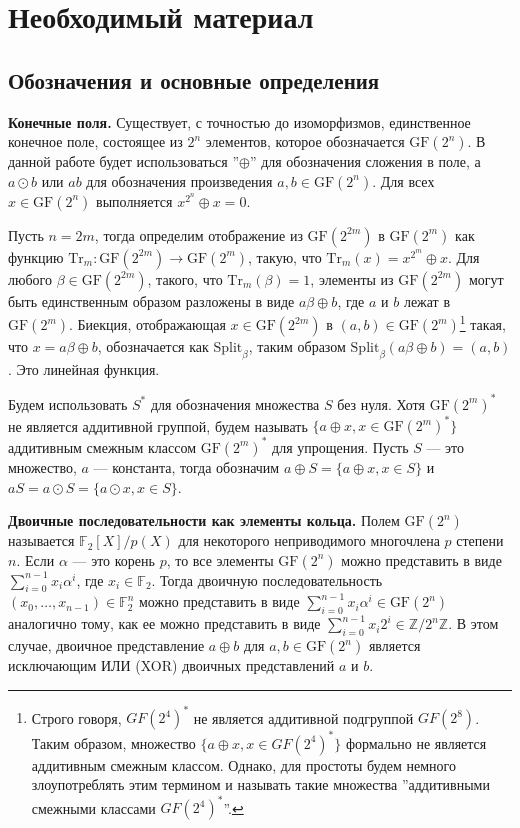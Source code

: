 \section{Необходимый материал}
\subsection{Обозначения и основные определения}
\textbf{Конечные поля.} Существует, с точностью до изоморфизмов, единственное конечное поле, состоящее из \(2^n\) элементов, которое обозначается \(\text{GF}(2^n)\). В данной работе будет использоваться ''\(\oplus\)'' для обозначения сложения в поле, а \(a \odot b\) или \(ab\) для обозначения произведения \(a, b \in \text{GF}(2^n)\). Для всех \(x \in \text{GF}(2^n)\) выполняется \(x^{2^n} \oplus x = 0\).

Пусть \(n = 2m\), тогда определим отображение из \(\text{GF}(2^{2m})\) в \(\text{GF}(2^m)\) как функцию \(\text{Tr}_m: \text{GF}(2^{2m}) \rightarrow \text{GF}(2^m)\), такую, что \(\text{Tr}_m(x) = x^{2^m} \oplus x\). Для любого \(\beta \in \text{GF}(2^{2m})\), такого, что \(\text{Tr}_m(\beta) = 1\), элементы из \(\text{GF}(2^{2m})\) могут быть единственным образом разложены в виде \(a\beta \oplus b\), где \(a\) и \(b\) лежат в \(\text{GF}(2^m)\). Биекция, отображающая \(x \in \text{GF}(2^{2m})\) в \((a, b) \in \text{GF}(2^m)\)\footnote{Строго говоря, \(GF(2^4)^*\) не является аддитивной подгруппой \(GF(2^8)\). Таким образом, множество \(\{a \oplus x, x \in GF(2^4)^*\}\) формально не является аддитивным смежным классом. Однако, для простоты будем немного злоупотреблять этим термином и называть такие множества ''аддитивными смежными классами \(GF(2^4)^*\)''.} такая, что \(x = a\beta \oplus b\), обозначается как \(\text{Split}_\beta\), таким образом \(\text{Split}_\beta(a\beta \oplus b) = (a, b)\). Это линейная функция.

Будем использовать \(S^*\) для обозначения множества \(S\) без нуля. Хотя \(\text{GF}(2^m)^*\) не является аддитивной группой, будем называть \(\{a \oplus x, x \in \text{GF}(2^m)^*\}\) аддитивным смежным классом \(\text{GF}(2^m)^*\) для упрощения. Пусть \(S\) — это множество, \(a\) — константа, тогда обозначим \(a \oplus S = \{a \oplus x, x \in S\}\) и \(aS = a \odot S = \{a \odot x, x \in S\}\).

\textbf{Двоичные последовательности как элементы кольца.} Полем \(\text{GF}(2^n)\) называется \(\mathbb{F}_2[X]/p(X)\) для некоторого неприводимого многочлена \(p\) степени \(n\). Если \(\alpha\) — это корень \(p\), то все элементы \(\text{GF}(2^n)\) можно представить в виде \(\sum_{i=0}^{n-1} x_i \alpha^i\), где \(x_i \in \mathbb{F}_2\). Тогда двоичную последовательность \((x_0, \ldots, x_{n-1}) \in \mathbb{F}_2^n\) можно представить в виде \(\sum_{i=0}^{n-1} x_i \alpha^i \in \text{GF}(2^n)\) аналогично тому, как ее можно представить в виде \(\sum_{i=0}^{n-1} x_i 2^i \in \mathbb{Z}/2^n\mathbb{Z}\). В этом случае, двоичное представление \(a \oplus b\) для \(a, b \in \text{GF}(2^n)\) является исключающим ИЛИ (XOR) двоичных представлений \(a\) и \(b\).

